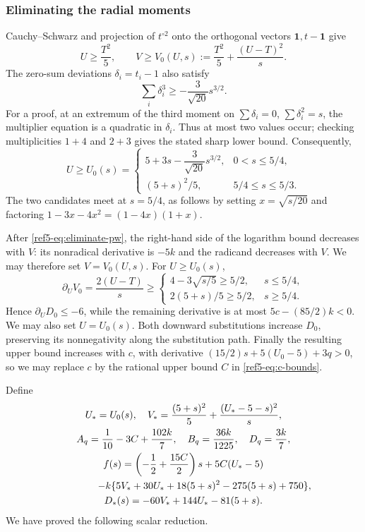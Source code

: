 \documentclass[11pt]{article}
\theoremstyle{remark}
\newcommand{\one}{\mathbf 1}
\numberwithin{equation}{section}
\begin{document}
\subsubsection{Eliminating the radial moments}
Cauchy--Schwarz and projection of $t^{\circ2}$ onto the orthogonal
vectors $\one,t-\one$ give
\begin{equation}\label{ref5-eq:UV}
 U\ge\frac{T^2}{5},\qquad
 V\ge V_0(U,s):=\frac{T^2}{5}+\frac{(U-T)^2}{s}.
\end{equation}
The zero-sum deviations $\delta_i=t_i-1$ also satisfy
\[
 \sum_i\delta_i^3\ge-\frac3{\sqrt{20}}s^{3/2}.
\]
For a proof, at an extremum of the third moment on
$\sum\delta_i=0$, $\sum\delta_i^2=s$, the multiplier equation is a
quadratic in $\delta_i$. Thus at most two values occur; checking
multiplicities $1+4$ and $2+3$ gives the stated sharp lower bound.
Consequently,
\begin{equation}\label{ref5-eq:U0}
 U\ge U_0(s)=
 \begin{cases}
 5+3s-\dfrac3{\sqrt{20}}s^{3/2},&0<s\le5/4,\\[2pt]
 (5+s)^2/5,&5/4\le s\le5/3.
 \end{cases}
\end{equation}
The two candidates meet at $s=5/4$, as follows by setting
$x=\sqrt{s/20}$ and factoring
$1-3x-4x^2=(1-4x)(1+x)$.

After \eqref{ref5-eq:eliminate-pw}, the right-hand side of the logarithm
bound decreases with $V$: its nonradical derivative is $-5k$ and
the radicand decreases with $V$.
We may therefore set $V=V_0(U,s)$.
For $U\ge U_0(s)$,
\[
 \partial_U V_0=\frac{2(U-T)}s
 \ge\begin{cases}
 4-3\sqrt{s/5}\ge5/2,&s\le5/4,\\
 2(5+s)/5\ge5/2,&s\ge5/4.
 \end{cases}
\]
Hence $\partial_U D_0\le-6$, while the remaining derivative is at most
$5c-(85/2)k<0$. We may also set $U=U_0(s)$.
Both downward substitutions increase $D_0$, preserving its
nonnegativity along the substitution path.
Finally the resulting upper bound increases with $c$, with derivative
$(15/2)s+5(U_0-5)+3q>0$, so we may replace $c$ by the rational upper
bound $C$ in \eqref{ref5-eq:c-bounds}.

Define
\begin{equation}\label{ref5-eq:scalar-definitions}
\begin{gathered}
 U_*=U_0(s),\quad V_*=\frac{(5+s)^2}{5}
                  +\frac{(U_*-5-s)^2}{s},\\
 A_q=\frac1{10}-3C+\frac{102k}{7},\quad
 B_q=\frac{36k}{1225},\quad D_q=\frac{3k}{7},\\
 f(s)=\left(-\frac12+\frac{15C}{2}\right)s+5C(U_*-5)\\
 \hspace{15mm}-k\{5V_*+30U_*+18(5+s)^2-275(5+s)+750\},\\
 D_*(s)=-60V_*+144U_*-81(5+s).
\end{gathered}
\end{equation}
We have proved the following scalar reduction.
\end{document}
